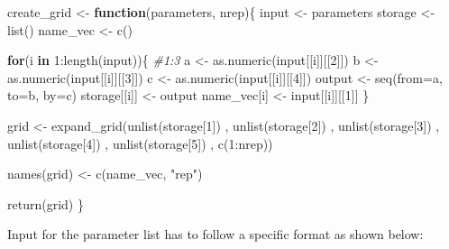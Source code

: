 \documentclass[11pt,a4paper]{article}
\newenvironment{Shaded}{\begin{snugshade}}{\end{snugshade}}
\newcommand{\AttributeTok}[1]{\textcolor[rgb]{0.77,0.63,0.00}{#1}}
\newcommand{\CommentTok}[1]{\textcolor[rgb]{0.56,0.35,0.01}{\textit{#1}}}
\newcommand{\ControlFlowTok}[1]{\textcolor[rgb]{0.13,0.29,0.53}{\textbf{#1}}}
\newcommand{\DecValTok}[1]{\textcolor[rgb]{0.00,0.00,0.81}{#1}}
\newcommand{\FunctionTok}[1]{\textcolor[rgb]{0.00,0.00,0.00}{#1}}
\newcommand{\NormalTok}[1]{#1}
\newcommand{\OtherTok}[1]{\textcolor[rgb]{0.56,0.35,0.01}{#1}}
\newcommand{\SpecialCharTok}[1]{\textcolor[rgb]{0.00,0.00,0.00}{#1}}
\newcommand{\StringTok}[1]{\textcolor[rgb]{0.31,0.60,0.02}{#1}}
\begin{document}
\begin{Shaded}
\begin{Highlighting}[]
\NormalTok{create\_grid }\OtherTok{\textless{}{-}} \ControlFlowTok{function}\NormalTok{(parameters, nrep)\{}
\NormalTok{  input }\OtherTok{\textless{}{-}}\NormalTok{ parameters}
\NormalTok{  storage }\OtherTok{\textless{}{-}} \FunctionTok{list}\NormalTok{()}
\NormalTok{  name\_vec }\OtherTok{\textless{}{-}} \FunctionTok{c}\NormalTok{()}
  
  \ControlFlowTok{for}\NormalTok{(i }\ControlFlowTok{in} \DecValTok{1}\SpecialCharTok{:}\FunctionTok{length}\NormalTok{(input))\{ }\CommentTok{\#1:3}
\NormalTok{    a }\OtherTok{\textless{}{-}} \FunctionTok{as.numeric}\NormalTok{(input[[i]][[}\DecValTok{2}\NormalTok{]])}
\NormalTok{    b }\OtherTok{\textless{}{-}} \FunctionTok{as.numeric}\NormalTok{(input[[i]][[}\DecValTok{3}\NormalTok{]])}
\NormalTok{    c }\OtherTok{\textless{}{-}} \FunctionTok{as.numeric}\NormalTok{(input[[i]][[}\DecValTok{4}\NormalTok{]])}
\NormalTok{    output }\OtherTok{\textless{}{-}} \FunctionTok{seq}\NormalTok{(}\AttributeTok{from=}\NormalTok{a, }\AttributeTok{to=}\NormalTok{b, }\AttributeTok{by=}\NormalTok{c)}
\NormalTok{    storage[[i]] }\OtherTok{\textless{}{-}}\NormalTok{  output}
\NormalTok{    name\_vec[i] }\OtherTok{\textless{}{-}}\NormalTok{ input[[i]][[}\DecValTok{1}\NormalTok{]]}
\NormalTok{  \}}
  
\NormalTok{  grid }\OtherTok{\textless{}{-}} \FunctionTok{expand\_grid}\NormalTok{(}\FunctionTok{unlist}\NormalTok{(storage[}\DecValTok{1}\NormalTok{])}
\NormalTok{                      , }\FunctionTok{unlist}\NormalTok{(storage[}\DecValTok{2}\NormalTok{])}
\NormalTok{                      , }\FunctionTok{unlist}\NormalTok{(storage[}\DecValTok{3}\NormalTok{])}
\NormalTok{                      , }\FunctionTok{unlist}\NormalTok{(storage[}\DecValTok{4}\NormalTok{])}
\NormalTok{                      , }\FunctionTok{unlist}\NormalTok{(storage[}\DecValTok{5}\NormalTok{])}
\NormalTok{                      , }\FunctionTok{c}\NormalTok{(}\DecValTok{1}\SpecialCharTok{:}\NormalTok{nrep))}
  
  \FunctionTok{names}\NormalTok{(grid) }\OtherTok{\textless{}{-}} \FunctionTok{c}\NormalTok{(name\_vec, }\StringTok{"rep"}\NormalTok{)}
  
  \FunctionTok{return}\NormalTok{(grid)}
\NormalTok{\}}
\end{Highlighting}
\end{Shaded}

Input for the parameter list has to follow a specific format as shown
below:
\end{document}
